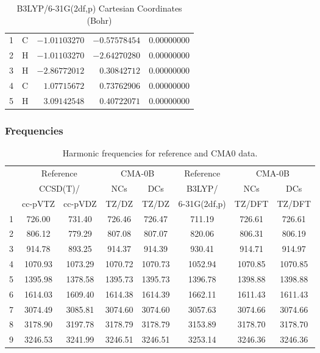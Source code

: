 \documentclass[10pt,oneside]{article}
\begin{document}
\begin{table}[h!]
\centering
\caption{B3LYP/6-31G(2df,p) Cartesian Coordinates (Bohr)}
\begin{tabular}{llrrr}
1  & C  & $-1.01103270$ & $-0.57578454$ & $ 0.00000000$ \\
2  & H  & $-1.01103270$ & $-2.64270280$ & $ 0.00000000$ \\
3  & H  & $-2.86772012$ & $ 0.30842712$ & $ 0.00000000$ \\
4  & C  & $ 1.07715672$ & $ 0.73762906$ & $ 0.00000000$ \\
5  & H  & $ 3.09142548$ & $ 0.40722071$ & $ 0.00000000$ \\
\end{tabular}
\end{table}

\clearpage

\subsubsection*{Frequencies}
\begin{table}[h!]
\centering
\caption{Harmonic frequencies for reference and CMA0 data.}
\begin{tabular}{cccccccc}
\toprule
{} & \multicolumn{2}{c}{Reference} & \multicolumn{2}{c}{CMA-0B} &    Reference & \multicolumn{2}{c}{CMA-0B} \\
{} & \multicolumn{2}{c}{CCSD(T)/} &     NCs &     DCs &       B3LYP/ &     NCs &     DCs \\
{} &   cc-pVTZ & cc-pVDZ &   TZ/DZ &   TZ/DZ & 6-31G(2df,p) &  TZ/DFT &  TZ/DFT \\
\midrule
1 &    726.00 &  731.40 &  726.46 &  726.47 &       711.19 &  726.61 &  726.61 \\
2 &    806.12 &  779.29 &  807.08 &  807.07 &       820.06 &  806.31 &  806.19 \\
3 &    914.78 &  893.25 &  914.37 &  914.39 &       930.41 &  914.71 &  914.97 \\
4 &   1070.93 & 1073.29 & 1070.72 & 1070.73 &      1052.94 & 1070.85 & 1070.85 \\
5 &   1395.98 & 1378.58 & 1395.73 & 1395.73 &      1396.78 & 1398.88 & 1398.88 \\
6 &   1614.03 & 1609.40 & 1614.38 & 1614.39 &      1662.11 & 1611.43 & 1611.43 \\
7 &   3074.49 & 3085.81 & 3074.60 & 3074.60 &      3057.63 & 3074.66 & 3074.66 \\
8 &   3178.90 & 3197.78 & 3178.79 & 3178.79 &      3153.89 & 3178.70 & 3178.70 \\
9 &   3246.53 & 3241.99 & 3246.51 & 3246.51 &      3253.14 & 3246.36 & 3246.36 \\
\bottomrule
\end{tabular}
\end{table}
\end{document}
